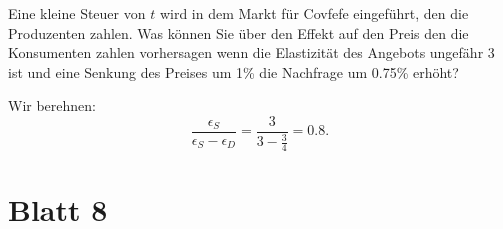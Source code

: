 \begin{question}
	Eine kleine Steuer von $t$ wird in dem Markt für Covfefe eingeführt, den die Produzenten zahlen. Was
	können Sie über den Effekt auf den Preis den die Konsumenten zahlen vorhersagen wenn die Elastizität
	des Angebots ungefähr 3 ist und eine Senkung des Preises um 1\% die Nachfrage um 0.75\% erhöht?

\end{question}
\begin{solution}

	Wir berehnen:
	\[
		\frac{\epsilon_S}{\epsilon_S- \epsilon_D} = \frac{3}{3- \frac{3}{4}} = 0.8
		.\]

\end{solution}



\section{Blatt 8}

